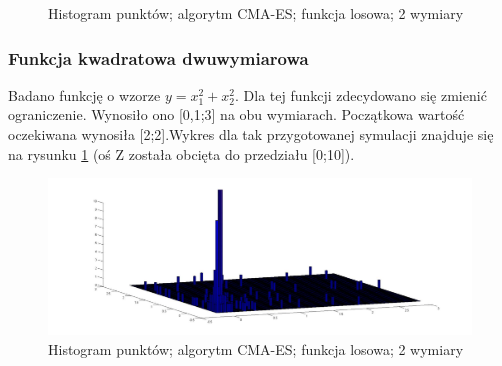 \documentclass{mini}
\begin{document}
\begin{figure}[H]
\centering
{}
\quad
{}
\caption{Histogram punktów; algorytm CMA-ES; funkcja losowa; 2 wymiary}
\end{figure}

\subsubsection*{Funkcja kwadratowa dwuwymiarowa}
Badano funkcję o wzorze $y=x_1^2+x_2^2$. Dla tej funkcji zdecydowano się zmienić ograniczenie. Wynosiło ono [0,1;3] na obu wymiarach. Początkowa wartość oczekiwana wynosiła [2;2].Wykres dla tak przygotowanej symulacji znajduje się na rysunku \ref{cmaes:x2} (oś Z została obcięta do przedziału [0;10]).

\begin{figure}[H]
\centering
\includegraphics[width=\textwidth]{cmaes-x2dim2-boundaries-v2}
\caption{Histogram punktów; algorytm CMA-ES; funkcja losowa; 2 wymiary}
\label{cmaes:x2}
\end{figure}
\end{document}
